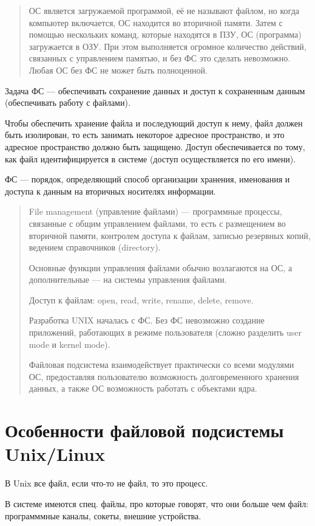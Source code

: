 \begin{quote}
	ОС является загружаемой программой, её не называют файлом, но когда компьютер включается, ОС находится во вторичной памяти. Затем с помощью нескольких команд, которые находятся в ПЗУ, ОС (программа) загружается в ОЗУ. При этом выполняется огромное количество действий, связанных с управлением памятью, и без ФС это сделать невозможно. Любая ОС без ФС не может быть полноценной.
\end{quote}

Задача ФС --- обеспечивать сохранение данных и доступ к сохраненным данным (обеспечивать работу с файлами).

Чтобы обеспечить хранение файла и последующий доступ к нему, файл должен быть изолирован, то есть занимать некоторое адресное пространство, и это адресное пространство должно быть защищено. Доступ обеспечивается по тому, как файл идентифицируется в системе (доступ осуществляется по его имени).

ФС --- порядок, определяющий способ организации хранения, именования и доступа к данным на вторичных носителях информации.

\begin{quote}
	File management (управление файлами) --- программные процессы, связанные с общим управлением файлами, то есть с размещением во вторичной памяти, контролем доступа к файлам, записью резервных копий, ведением справочников (directory).
	
	Основные функции управления файлами обычно возлагаются на ОС, а дополнительные --- на системы управления файлами.
	
	Доступ к файлам: open, read, write, rename, delete, remove.
	
	Разработка UNIX началась с ФС. Без ФС невозможно создание приложений, работающих в режиме пользователя (сложно разделить user mode и kernel mode).
	
	Файловая подсистема взаимодействует практически со всеми модулями ОС, предоставляя пользователю возможность долговременного хранения данных, а также ОС возможность работать с объектами ядра.
\end{quote}

\section{Особенности файловой подсистемы Unix/Linux}
В Unix все файл, если что-то не файл, то это процесс.

В системе имеются спец. файлы, про которые говорят, что они больше чем файл: программмные каналы, сокеты, внешние устройства.

